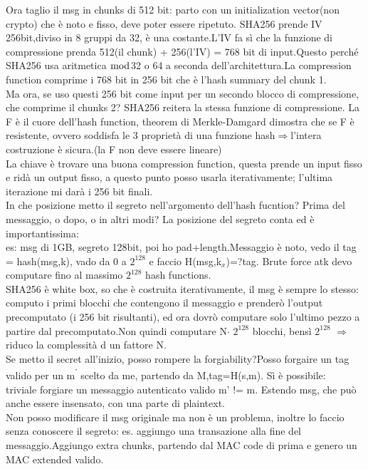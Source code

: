 \documentclass[16px]{article}
\begin{document}
Ora taglio il msg in chunks di 512 bit: parto con un initialization vector(non crypto) che è noto e fisso, deve poter essere ripetuto. SHA256 prende IV 256bit,diviso in 8 gruppi da 32, è una costante.L'IV fa sì che la funzione di compressione prenda 512(il chunk) + 256(l'IV) = 768 bit di input.Questo perché SHA256 usa aritmetica $\bmod$32 o 64 a seconda dell'architettura.La compression function comprime i 768 bit in 256 bit che è l'hash summary del chunk 1.\\
Ma ora, se uso questi 256 bit come input per un secondo blocco di compressione, che comprime il chunks 2? SHA256 reitera la stessa funzione di compressione.
La F è il cuore dell'hash function, theorem di Merkle-Damgard dimostra che se F è resistente, ovvero soddisfa le 3 proprietà di una funzione hash$\Rightarrow$l'intera costruzione è sicura.(la F non deve essere lineare)\\La chiave è trovare una buona compression function, questa prende un input fisso e ridà un output fisso, a questo punto posso usarla iterativamente; l'ultima iterazione mi darà i 256 bit finali.\\
In che posizione metto il segreto nell'argomento dell'hash fucntion? Prima del messaggio, o dopo, o in altri modi?
La posizione del segreto conta ed è importantissima:\\
es: msg di 1GB, segreto 128bit, poi ho pad+length.Messaggio è noto, vedo il tag = hash(msg,k), vado da 0 a $2^{128}$ e faccio H(msg,k$_{x}$)=?tag. Brute force atk devo computare fino al massimo $2^{128}$ hash functions.\\
SHA256 è white box, so che è costruita iterativamente, il msg è sempre lo stesso: computo i primi blocchi che contengono il messaggio e prenderò l'output precomputato (i 256 bit risultanti), ed ora dovrò computare solo l'ultimo pezzo a partire dal precomputato.Non quindi computare N$\cdot$ $2^{128}$ blocchi, bensì $2^{128}$ $\Rightarrow$ riduco la complessità d un fattore N.\\Se metto il secret all'inizio, posso rompere la forgiability?Posso forgaire un tag valido per un m\textsuperscript{'} scelto da me, partendo da M,tag=H(s,m). Sì è possibile:\\
triviale forgiare un messaggio autenticato valido
m' != m.
Estendo msg, che può anche essere insensato, con una parte di plaintext.\\
Non posso modificare il msg originale ma non è un problema, inoltre lo faccio senza conoscere il segreto: es. aggiungo una transazione alla fine del messaggio.Aggiungo extra chunks, partendo dal MAC code di prima e genero un MAC extended valido.\\
\end{document}
